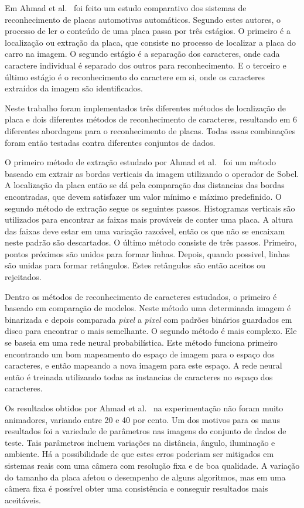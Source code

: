 Em Ahmad et al.~\cite{ahmad2015automatic} foi feito um estudo comparativo dos
sistemas de reconhecimento de placas automotivas automáticos. Segundo estes
autores, o processo de ler o conteúdo de uma placa passa por três estágios. O
primeiro é a localização ou extração da placa, que consiste no processo de
localizar a placa do carro na imagem. O segundo estágio é a separação dos
caracteres, onde cada caractere individual é separado dos outros para
reconhecimento. E o terceiro e último estágio é o reconhecimento do caractere em
si, onde os caracteres extraídos da imagem são identificados.

Neste trabalho foram implementados três diferentes métodos de localização de
placa e dois diferentes métodos de reconhecimento de caracteres, resultando em 6
diferentes abordagens para o reconhecimento de placas. Todas essas combinações
foram então testadas contra diferentes conjuntos de dados.

O primeiro método de extração estudado por Ahmad et al.~\cite{ahmad2015automatic} foi um método baseado em extrair as bordas verticais da imagem utilizando o operador de Sobel. A localização da placa então se dá pela comparação das distancias das bordas encontradas, que devem satisfazer um valor mínimo e máximo predefinido. O segundo método de extração segue os seguintes passos. Histogramas verticais são utilizados para encontrar as faixas mais prováveis de conter uma placa. A altura das faixas deve estar em uma variação razoável, então os que não se encaixam neste padrão são descartados. O último método consiste de três passos. Primeiro, pontos próximos são unidos para formar linhas. Depois, quando possivel, linhas são unidas para formar retângulos. Estes retângulos são então aceitos ou rejeitados.

Dentro os métodos de reconhecimento de caracteres estudados, o primeiro é baseado em comparação de modelos. Neste método uma determinada imagem é binarizada e depois comparada \emph{pixel} a \emph{pixel} com padrões binários guardados em disco para encontrar o mais semelhante. O segundo método é mais complexo. Ele se baseia em uma rede neural probabilística. Este método funciona primeiro encontrando um bom mapeamento do espaço de imagem para o espaço dos caracteres, e então mapeando a nova imagem para este espaço. A rede neural então é treinada utilizando todas as instancias de caracteres no espaço dos caracteres.

Os resultados obtidos por Ahmad et al.~\cite{ahmad2015automatic} na experimentação não
foram muito animadores, variando entre 20 e 40 por cento.
Um dos motivos para os maus resultados foi a variedade de parâmetros nas imagens do conjunto
de dados de teste. Tais parâmetros incluem
variações na distância, ângulo, iluminação e ambiente. Há a possibilidade de que estes erros poderiam ser
mitigados em sistemas reais com uma câmera com resolução fixa e de boa
qualidade. A variação do tamanho da placa afetou o desempenho de alguns
algoritmos, mas em uma câmera fixa é possível obter uma consistência e conseguir
resultados mais aceitáveis.

